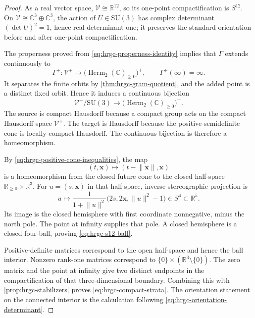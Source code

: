 \begin{proof}
As a real vector space, \(\mathscr V\cong\mathbb R^{12}\), so its one-point
compactification is \(S^{12}\).  On
\(\mathscr V\cong\mathbb C^3\oplus\mathbb C^3\), the action of
\(U\in\mathrm{SU}(3)\) has complex determinant \((\det U)^2=1\), hence
real determinant one; it preserves the standard orientation before and after
one-point compactification.

The properness proved from \eqref{eq:hrgc-properness-identity} implies that
\(\Gamma\) extends continuously to
\[
 \Gamma^+:\mathscr V^+\longrightarrow
 \bigl(\operatorname{Herm}_2(\mathbb C)_{\geq0}\bigr)^+,
 \qquad \Gamma^+(\infty)=\infty.
\]
It separates the finite orbits by \cref{thm:hrgc-gram-quotient}, and the
added point is a distinct fixed orbit.  Hence it induces a continuous
bijection
\[
 \mathscr V^+/\mathrm{SU}(3)
 \longrightarrow
 \bigl(\operatorname{Herm}_2(\mathbb C)_{\geq0}\bigr)^+.
\]
The source is compact Hausdorff because a compact group acts on the compact
Hausdorff space \(\mathscr V^+\).  The target is Hausdorff because the
positive-semidefinite cone is locally compact Hausdorff.  The continuous
bijection is therefore a homeomorphism.

By \eqref{eq:hrgc-positive-cone-inequalities}, the map
\[
 (t,\mathbf x)\longmapsto(t-\lVert\mathbf x\rVert,\mathbf x)
\]
is a homeomorphism from the closed future cone to the closed half-space
\(\mathbb R_{\geq0}\times\mathbb R^3\).  For \(u=(s,\mathbf x)\) in that half-space,
inverse stereographic projection is
\begin{equation}
 u\longmapsto
 \frac{1}{1+\lVert u\rVert^2}
 \bigl(2s,2\mathbf x,\lVert u\rVert^2-1\bigr)
 \in S^4\subset\mathbb R^5.
 \label{eq:hrgc-halfspace-stereographic}
\end{equation}
Its image is the closed hemisphere with first coordinate nonnegative, minus
the north pole.  The point at infinity supplies that pole.  A closed
hemisphere is a closed four-ball, proving \eqref{eq:hrgc-s12-ball}.

Positive-definite matrices correspond to the open half-space and hence the
ball interior.  Nonzero rank-one matrices correspond to
\(\{0\}\times(\mathbb R^3\setminus\{0\})\).  The zero matrix and the point at
infinity give two distinct endpoints in the compactification of that
three-dimensional boundary.  Combining this with
\cref{prop:hrgc-stabilizers} proves \eqref{eq:hrgc-compact-strata}.  The
orientation statement on the connected interior is the calculation following
\eqref{eq:hrgc-orientation-determinant}.
\end{proof}

